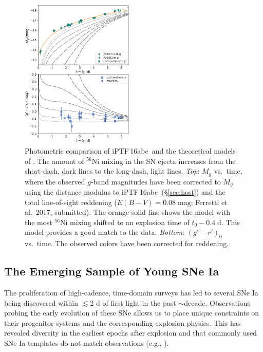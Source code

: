 \documentclass[twocolumn]{aastex61}
\newcommand{\abc}{iPTF\,16abc}
\begin{document}
\begin{figure}[]
  \centering
  \includegraphics[width=0.48\textwidth]{iPTF16abc_Ni_lc.pdf}
  \caption{Photometric comparison of \abc\ and the theoretical 
  models of \citet{2016ApJ...826...96P}. The amount of $^{56}$Ni 
  mixing in the SN ejecta increases from the short-dash, dark lines 
  to the long-dash, light lines.
  \textit{Top}: $M_g$ vs.\ time, where the observed $g$-band 
  magnitudes  
  have been corrected to $M_g$ using the distance modulus to \abc\ 
  (\S\ref{sec:host})
  and the total line-of-sight reddening ($E(B-V) = 0.08 \; 
  \mathrm{mag}$; Ferretti et al.\ 2017, submitted). The orange 
  solid line shows the model with the most $^{56}$Ni mixing 
  shifted to an explosion time of $t_0 - 0.4 \; \mathrm{d}$. This 
  model provides a good match to the data.
  \textit{Bottom}: $(g' - r')_0$ vs.\ time. The observed colors 
  have been corrected for reddening.
  }
  \label{fig:Ni56LC}
\end{figure}

\subsection{The Emerging Sample of Young SNe Ia}

The proliferation of high-cadence, time-domain surveys has led to several SNe Ia being discovered within $\lesssim$2 d of first light in the past $\sim$decade. Observations probing the early evolution of these SNe allows us to place unique constraints on their progenitor systems and the corresponding explosion physics. This has revealed diversity in the earliest epochs after explosion and that commonly used SNe Ia templates do not match observations (e.g., \citealt{2012ApJ...744...38F}).
\end{document}
